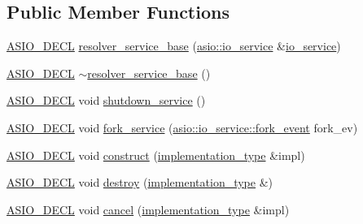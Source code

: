 \subsection*{Public Member Functions}
\begin{DoxyCompactItemize}
\item 
\hyperlink{config_8hpp_ab54d01ea04afeb9a8b39cfac467656b7}{A\+S\+I\+O\+\_\+\+D\+E\+C\+L} \hyperlink{classasio_1_1detail_1_1resolver__service__base_adfd6da0050bd01c7eb6c62c800573212}{resolver\+\_\+service\+\_\+base} (\hyperlink{classasio_1_1io__service}{asio\+::io\+\_\+service} \&\hyperlink{classasio_1_1io__service}{io\+\_\+service})
\item 
\hyperlink{config_8hpp_ab54d01ea04afeb9a8b39cfac467656b7}{A\+S\+I\+O\+\_\+\+D\+E\+C\+L} \hyperlink{classasio_1_1detail_1_1resolver__service__base_a4b361e11ef6e16fe8d2c2e6e05099186}{$\sim$resolver\+\_\+service\+\_\+base} ()
\item 
\hyperlink{config_8hpp_ab54d01ea04afeb9a8b39cfac467656b7}{A\+S\+I\+O\+\_\+\+D\+E\+C\+L} void \hyperlink{classasio_1_1detail_1_1resolver__service__base_aeb5dc5b2e08790dceeec8852bf0d28c4}{shutdown\+\_\+service} ()
\item 
\hyperlink{config_8hpp_ab54d01ea04afeb9a8b39cfac467656b7}{A\+S\+I\+O\+\_\+\+D\+E\+C\+L} void \hyperlink{classasio_1_1detail_1_1resolver__service__base_aa3674d3318ade35b170bdf52ef236932}{fork\+\_\+service} (\hyperlink{classasio_1_1io__service_a45f084ae64e601f7ead3f891d5ed0fc6}{asio\+::io\+\_\+service\+::fork\+\_\+event} fork\+\_\+ev)
\item 
\hyperlink{config_8hpp_ab54d01ea04afeb9a8b39cfac467656b7}{A\+S\+I\+O\+\_\+\+D\+E\+C\+L} void \hyperlink{classasio_1_1detail_1_1resolver__service__base_a8ef7ed77af2484c8b235edb8c85ba6e7}{construct} (\hyperlink{classasio_1_1detail_1_1resolver__service__base_ab07ff8adc9e2f3d5841021e99e190c16}{implementation\+\_\+type} \&impl)
\item 
\hyperlink{config_8hpp_ab54d01ea04afeb9a8b39cfac467656b7}{A\+S\+I\+O\+\_\+\+D\+E\+C\+L} void \hyperlink{classasio_1_1detail_1_1resolver__service__base_a6304acb1fe29ca8fff3df2fd81bd6b29}{destroy} (\hyperlink{classasio_1_1detail_1_1resolver__service__base_ab07ff8adc9e2f3d5841021e99e190c16}{implementation\+\_\+type} \&)
\item 
\hyperlink{config_8hpp_ab54d01ea04afeb9a8b39cfac467656b7}{A\+S\+I\+O\+\_\+\+D\+E\+C\+L} void \hyperlink{classasio_1_1detail_1_1resolver__service__base_ad88e105b499b702a2f7d49e7a6a5418b}{cancel} (\hyperlink{classasio_1_1detail_1_1resolver__service__base_ab07ff8adc9e2f3d5841021e99e190c16}{implementation\+\_\+type} \&impl)
\end{DoxyCompactItemize}
